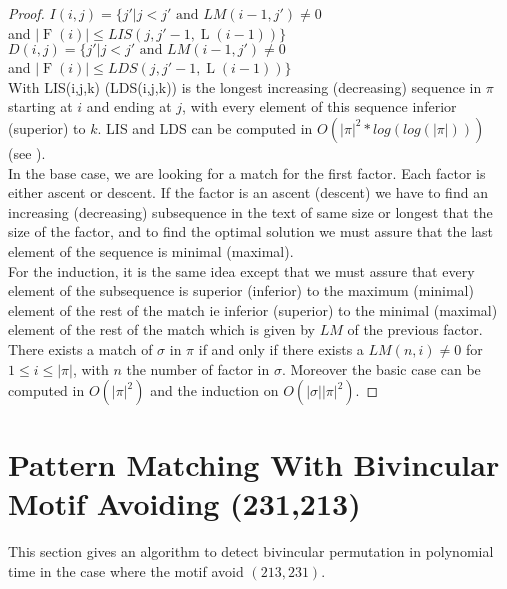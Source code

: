 \documentclass[a4paper]{llncs}
\newcommand{\ptext}{\pi}
\newcommand{\pmotif}{\sigma}
\newcounter{num}
\DeclareMathOperator{\firsta}{L}
\newcommand{\first}[1]{\firsta({#1})}
\DeclareMathOperator{\factora}{F}
\newcommand{\factor}[1]{\factora({#1})}
\begin{document}
\begin{proof}
$I(i,j)=\{j'|\text{$j<j'$ and $LM(i-1,j')\neq 0$}$ \\
\indent \indent \indent and  $|\factor{i}| \leq LIS(j,j'-1,\first{i-1})\}$ \\

$D(i,j)=\{j'|\text{$j<j'$ and $LM(i-1,j')\neq 0$}$ \\
\indent \indent \indent and  $|\factor{i}| \leq LDS(j,j'-1,\first{i-1}) \}$ \\
					                       
With LIS(i,j,k) (LDS(i,j,k)) is the longest increasing (decreasing) sequence in $\ptext$ starting at $i$ and ending at $j$,
with every element of this sequence
inferior (superior) to $k$. 
LIS and LDS can be computed in $O(|\ptext|^2*log(log(|\ptext|)))$ (see \cite{Bespamyatnikh00enumeratinglongest}).\\
			
In the base case, 
we are looking for a match for the first factor.
Each factor is either ascent or descent.
If the factor is an ascent (descent)
we have to find an increasing (decreasing) subsequence
in the text of same size or longest that 
the size of the factor,
and to find the optimal solution 
we must assure that the last element
of the sequence is minimal (maximal).\\
For the induction, it is the same idea
except that we must assure that 
every element of the subsequence is superior (inferior)
to the maximum (minimal) element of the rest of the match
ie inferior (superior) to the minimal (maximal) element of the rest of the match
which is given by $LM$ of
the previous factor.\\

There exists a match of $\pmotif$ in $\ptext$ if and only if
there exists a $LM(n,i)\neq 0$ for $1 \leq i \leq |\ptext|$,
with $n$ the number of factor in $\pmotif$.
Moreover the basic case can be computed in $O(|\ptext|^2)$
and the induction on $O(|\pmotif||\ptext|^2)$.
\end{proof}
					

\section{Pattern Matching With Bivincular Motif Avoiding (231,213)}	
\label{section:bivincular}

This section gives an algorithm to detect bivincular permutation in polynomial time in the case where the motif avoid $(213,231)$.
\end{document}
